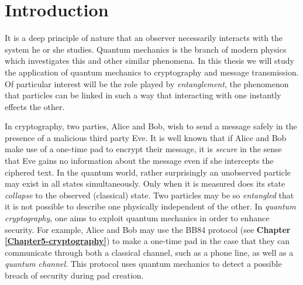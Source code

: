 
\chapter{Introduction} %

\label{Chapter1-introduction} %


\newcommand{\keyword}[1]{\textbf{#1}}
\newcommand{\tabhead}[1]{\textbf{#1}}
\newcommand{\code}[1]{\texttt{#1}}
\newcommand{\file}[1]{\texttt{\bfseries#1}}
\newcommand{\option}[1]{\texttt{\itshape#1}}




It is a deep principle of nature that an observer necessarily interacts with the system he or she studies. Quantum mechanics is the branch of modern physics which investigates this and other similar phenomena. In this thesis we will study the application of quantum mechanics to cryptography and message transmission. Of particular interest will be the role played by {\emph{entanglement}}, the phenomenon that particles can be linked in such a way that interacting with one instantly effects the other. 

In cryptography, two parties, Alice and Bob, wish to send a message safely in the presence of a malicious third party Eve. It is well known that if Alice and Bob make use of a one-time pad to encrypt their message, it is \emph{secure} in the sense that Eve gains no information about the message even if she intercepts the ciphered text. In the quantum world, rather surprisingly an unobserved particle may exist in all states simultaneously. Only when it is measured does its state {\emph{collapse}} to the observed (classical) state.  Two particles may be so {\emph{entangled}} that it is not possible to describe one physically independent of the other.  In {\emph{quantum cryptography}}, one aims to exploit quantum mechanics in order to enhance security. For example, Alice and Bob may use the BB84 protocol (see \textbf{Chapter \ref{Chapter5-cryptography}}) to make a one-time pad in the case that they can communicate through both a classical channel, such as a phone line, as well as a \textit{quantum channel}. This protocol uses quantum mechanics to detect a possible breach of security during pad creation.  



